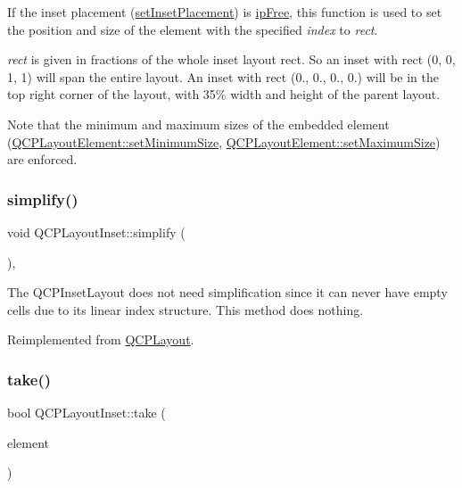 If the inset placement (\hyperlink{classQCPLayoutInset_a63298830744d5d8c5345511c00fd2144}{set\+Inset\+Placement}) is \hyperlink{classQCPLayoutInset_a8b9e17d9a2768293d2a7d72f5e298192aa4802986ea2cea457f932b115acba59e}{ip\+Free}, this function is used to set the position and size of the element with the specified {\itshape index} to {\itshape rect}.

{\itshape rect} is given in fractions of the whole inset layout rect. So an inset with rect (0, 0, 1, 1) will span the entire layout. An inset with rect (0., 0., 0., 0.) will be in the top right corner of the layout, with 35\% width and height of the parent layout.

Note that the minimum and maximum sizes of the embedded element (\hyperlink{classQCPLayoutElement_a5dd29a3c8bc88440c97c06b67be7886b}{Q\+C\+P\+Layout\+Element\+::set\+Minimum\+Size}, \hyperlink{classQCPLayoutElement_a74eb5280a737ab44833d506db65efd95}{Q\+C\+P\+Layout\+Element\+::set\+Maximum\+Size}) are enforced. \mbox{\label{classQCPLayoutInset_a18b7d508f0baa60cc5dcb1343cf7f32a}} 
\subsubsection{\texorpdfstring{simplify()}{simplify()}}
{\footnotesize\ttfamily void Q\+C\+P\+Layout\+Inset\+::simplify (\begin{DoxyParamCaption}{ }\end{DoxyParamCaption})\hspace{0.3cm}{\ttfamily [inline]}, {\ttfamily [virtual]}}

The Q\+C\+P\+Inset\+Layout does not need simplification since it can never have empty cells due to its linear index structure. This method does nothing. 

Reimplemented from \hyperlink{classQCPLayout_a41e6ac049143866e8f8b4964efab01b2}{Q\+C\+P\+Layout}.

\mbox{\label{classQCPLayoutInset_af7f13cc369f8190b5e7e17d5f39dfe1c}} 
\subsubsection{\texorpdfstring{take()}{take()}}
{\footnotesize\ttfamily bool Q\+C\+P\+Layout\+Inset\+::take (\begin{DoxyParamCaption}\item[{\hyperlink{classQCPLayoutElement}{Q\+C\+P\+Layout\+Element} $\ast$}]{element }\end{DoxyParamCaption})\hspace{0.3cm}{\ttfamily [virtual]}}

